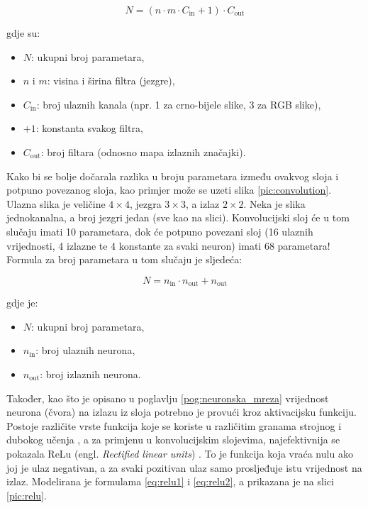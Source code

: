 \begin{equation}
    N = (n \cdot m \cdot C_{\text{in}} + 1) \cdot C_{\text{out}}
\end{equation}

gdje su:
\begin{itemize}
    \item \(N\): ukupni broj parametara,
    \item \(n\) i \(m\): visina i širina filtra (jezgre),
    \item \(C_{\text{in}}\): broj ulaznih kanala (npr. 1 za crno-bijele slike, 3 za RGB slike),
    \item \(+1\): konstanta svakog filtra,
    \item \(C_{\text{out}}\): broj filtara (odnosno mapa izlaznih značajki).
\end{itemize}

Kako bi se bolje dočarala razlika u broju parametara između ovakvog sloja i potpuno povezanog sloja,
kao primjer može se uzeti slika \ref{pic:convolution}. Ulazna slika je veličine \(4 \times 4\),
jezgra \(3 \times 3\), a izlaz 
\(2 \times 2\). Neka je slika jednokanalna, a broj jezgri jedan (sve kao na slici). Konvolucijski sloj
će u tom slučaju imati 10 parametara, dok će potpuno povezani sloj (16 ulaznih vrijednosti, 4 izlazne te
4 konstante za svaki neuron) imati 68 parametara! Formula za broj parametara u tom slučaju
je sljedeća:

\begin{equation}
    N = n_{\text{in}} \cdot n_{\text{out}} + n_{\text{out}}
\end{equation}

gdje je:
\begin{itemize}
    \item \(N\): ukupni broj parametara,
    \item \(n_{\text{in}}\): broj ulaznih neurona,
    \item \(n_{\text{out}}\): broj izlaznih neurona.
\end{itemize}

Također, kao što je opisano u poglavlju \ref{pog:neuronska_mreza} vrijednost neurona (čvora) na
izlazu iz sloja potrebno je provući kroz aktivacijsku funkciju. Postoje različite vrste funkcija
koje se koriste u različitim granama strojnog i dubokog učenja \cite{activation_fcn}, a za
primjenu u konvolucijskim slojevima, najefektivnija se pokazala ReLu (engl. \textit{Rectified linear units})
\cite{relu}. To je funkcija koja vraća nulu ako joj je ulaz negativan, a za svaki pozitivan
ulaz samo prosljeđuje istu vrijednost na izlaz. Modelirana je formulama \ref{eq:relu1} i 
\ref{eq:relu2}, a prikazana je na slici \ref{pic:relu}. 

